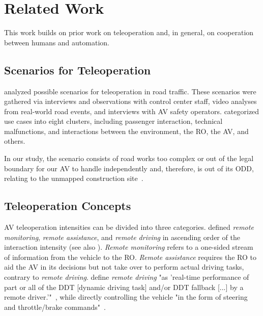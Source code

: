 \section{Related Work}
This work builds on prior work on teleoperation and, in general, on cooperation between humans and automation.

\subsection{Scenarios for Teleoperation}
\citet{kettwich_helping_2022} analyzed possible scenarios for teleoperation in road traffic. These scenarios were gathered via interviews and observations with control center staff, video analyses from real-world road events, and interviews with AV safety operators. \citet{kettwich_helping_2022} categorized use cases into eight clusters, including passenger interaction, technical malfunctions, and interactions between the environment, the RO, the AV, and others. 

In our study, the scenario consists of road works too complex or out of the legal boundary for our AV to handle independently and, therefore, is out of its ODD, relating to the unmapped construction site~\cite{kettwich_helping_2022}. %


\subsection{Teleoperation Concepts}
\label{ssec:conceptsofteleop}
AV teleoperation intensities can be divided into three categories. \citet{bogdoll_taxonomy_2022} defined %
\textit{remote monitoring}, \textit{remote assistance}, and \textit{remote driving} in ascending order of the interaction intensity (see also \citet{andersson2024navigating}). \textit{Remote monitoring} refers to a one-sided stream of information from the vehicle to the RO. \textit{Remote assistance} requires the RO to aid the AV in its decisions but not take over to perform actual driving tasks, contrary to \textit{remote driving}. \citet{bogdoll_taxonomy_2022} define \textit{remote driving} "as 'real-time performance of part or all of the DDT [dynamic driving task] and/or DDT fallback [...] by a remote driver.'"~\cite[p. 2]{bogdoll_taxonomy_2022}, while directly controlling the vehicle "in the form of steering and throttle/brake commands"~\cite[p. 10]{bogdoll_taxonomy_2022}.


